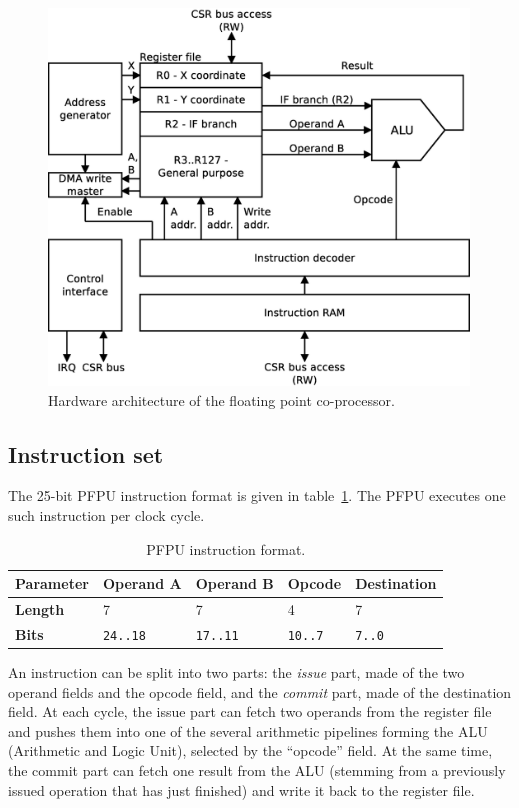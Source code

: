 \documentclass[a4paper,11pt]{kthesis}
\begin{document}
\begin{figure}[htp]
\centering
\includegraphics[height=100mm]{pfpu_architecture.eps}
\caption{Hardware architecture of the floating point co-processor.}
\label{fig:pfpuarch}
\end{figure}

\subsection{Instruction set}
The 25-bit PFPU instruction format is given in table~\ref{tab:pfpuinst}. The PFPU executes one such instruction per clock cycle.

\begin{table}
\centering
\begin{tabular}{|l|l|l|l|l|}
\hline
\textbf{Parameter} & Operand A & Operand B & Opcode & Destination \\
\hline
\textbf{Length} & 7 & 7 & 4 & 7 \\
\hline
\textbf{Bits} & \verb!24..18! & \verb!17..11! & \verb!10..7! & \verb!7..0! \\
\hline
\end{tabular}
\caption{PFPU instruction format.}\label{tab:pfpuinst}
\end{table}

An instruction can be split into two parts: the \textit{issue} part, made of the two operand fields and the opcode field, and the \textit{commit} part, made of the destination field. At each cycle, the issue part can fetch two operands from the register file and pushes them into one of the several arithmetic pipelines forming the ALU (Arithmetic and Logic Unit), selected by the ``opcode'' field. At the same time, the commit part can fetch one result from the ALU (stemming from a previously issued operation that has just finished) and write it back to the register file.
\end{document}
